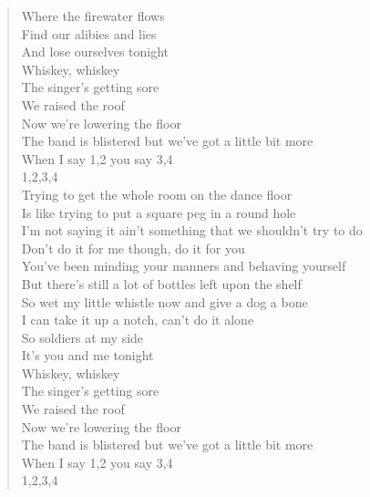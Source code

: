 \documentclass[11pt]{article}
\begin{document}
\begin{verse}
Where the firewater flows\\
Find our alibies and lies\\
And lose ourselves tonight\\
\vspace*{1em}
Whiskey, whiskey\\
The singer’s getting sore\\
We raised the roof\\
Now we’re lowering the floor\\
The band is blistered but we’ve got a little bit more\\
When I say 1,2 you say 3,4\\
1,2,3,4\\
Trying to get the whole room on the dance floor\\
Is like trying to put a square peg in a round hole\\
I’m not saying it ain’t something that we shouldn’t try to do\\
Don’t do it for me though, do it for you\\
You’ve been minding your manners and behaving yourself\\
But there’s still a lot of bottles left upon the shelf\\
So wet my little whistle now and give a dog a bone\\
I can take it up a notch, can’t do it alone\\
So soldiers at my side\\
It’s you and me tonight\\
\vspace*{1em}
Whiskey, whiskey\\
The singer’s getting sore\\
We raised the roof\\
Now we’re lowering the floor\\
The band is blistered but we’ve got a little bit more\\
When I say 1,2 you say 3,4\\
1,2,3,4\\
\end{verse}
\clearpage
\end{document}
